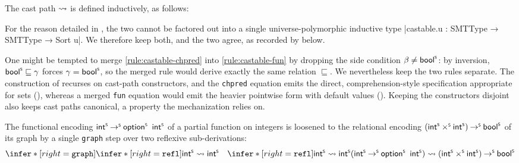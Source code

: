 \begin{definition}
  \label{def:castpath}
  The cast path $ \rightsquigarrow $ is defined inductively, as follows:
\end{definition}
For the reason detailed in , the two cannot be factored out into a single universe-polymorphic inductive type \leaninl|castable.{u} : SMTType → SMTType → Sort u|. We therefore keep both, and the two agree, as recorded by  below.

\begin{remark}
One might be tempted to merge \ref{rule:castable-chpred} into \ref{rule:castable-fun} by dropping the side condition $\beta \neq \mathsf{bool}^{\scriptscriptstyle{\mathsf{S}}}$: by inversion, $\mathsf{bool}^{\scriptscriptstyle{\mathsf{S}}} \sqsubseteq \gamma$ forces $\gamma = \mathsf{bool}^{\scriptscriptstyle{\mathsf{S}}}$, so the merged rule would derive exactly the same relation $\sqsubseteq$. We nevertheless keep the two rules separate. The construction of  recurses on cast-path constructors, and the \texttt{chpred} equation emits the direct, comprehension-style specification appropriate for sets (), whereas a merged \texttt{fun} equation would emit the heavier pointwise form with default values (). Keeping the constructors disjoint also keeps cast paths canonical, a property the mechanization relies on.
\end{remark}

\begin{example}
The functional encoding $\intS \toS \optS\ \intS$ of a partial function on integers is loosened to the relational encoding $(\mathsf{int}^{\scriptscriptstyle{\mathsf{S}}} \mathbin{\times^{\scriptscriptstyle{\mathsf{S}}}} \mathsf{int}^{\scriptscriptstyle{\mathsf{S}}}) \mathbin{\to^{\scriptscriptstyle{\mathsf{S}}}} \mathsf{bool}^{\scriptscriptstyle{\mathsf{S}}}$ of its graph by a single \texttt{graph} step over two reflexive sub-derivations:
\[
\infer*[right=\texttt{graph}]{
  \infer*[right=\texttt{refl}]{ }{\castpath{\intS}{\intS}}
  \quad
  \infer*[right=\texttt{refl}]{ }{\castpath{\intS}{\intS}}
}{\castpath{(\intS \toS \optS\ \intS)}{(\intS \timesS \intS) \toS \boolS}}
\]
\end{example}

